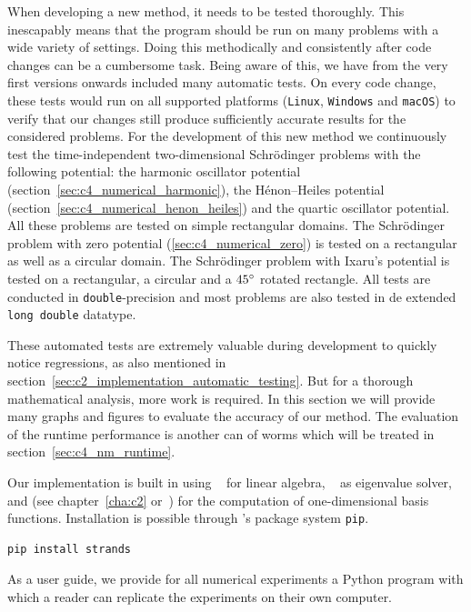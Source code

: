 When developing a new method, it needs to be tested thoroughly. This inescapably means that the program should be run on many problems with a wide variety of settings. Doing this methodically and consistently after code changes can be a cumbersome task. Being aware of this, we have from the very first versions onwards included many automatic tests. On every code change, these tests would run on all supported platforms (\texttt{Linux}, \texttt{Windows} and \texttt{macOS}) to verify that our changes still produce sufficiently accurate results for the considered problems. For the development of this new method we continuously test the time-independent two-dimensional Schrödinger problems with the following potential: the harmonic oscillator potential (section~\ref{sec:c4_numerical_harmonic}), the Hénon--Heiles potential (section~\ref{sec:c4_numerical_henon_heiles}) and the quartic oscillator potential. All these problems are tested on simple rectangular domains. The Schrödinger problem with zero potential (\ref{sec:c4_numerical_zero}) is tested on a rectangular as well as a circular domain. The Schrödinger problem with Ixaru's potential is tested on a rectangular, a circular and a $45\degree$ rotated rectangle. All tests are conducted in \texttt{double}-precision and most problems are also tested in de extended \texttt{long double} datatype.

These automated tests are extremely valuable during development to quickly notice regressions, as also mentioned in section~\ref{sec:c2_implementation_automatic_testing}. But for a thorough mathematical analysis, more work is required. In this section we will provide many graphs and figures to evaluate the accuracy of our method. The evaluation of the runtime performance is another can of worms which will be treated in section~\ref{sec:c4_nm_runtime}.

Our implementation is built in \cpp{} using \Eigen{}~\cite{guennebaud_eigen_2010} for linear algebra, \spectra{}~\cite{qiu_spectra_2022} as eigenvalue solver, and  (see chapter~\ref{cha:c2} or~\cite{baeyens_fast_2020}) for the computation of one-dimensional basis functions. Installation is possible through \lpython{}'s package system \texttt{pip}.
\begin{verbatim}
pip install strands
\end{verbatim}

As a user guide, we provide for all numerical experiments a Python program with which a reader can replicate the experiments on their own computer.

